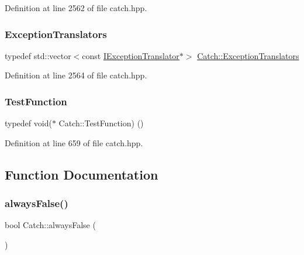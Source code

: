 Definition at line 2562 of file catch.\+hpp.

\hypertarget{namespace_catch_ae0442a3627f91437716106138b5f540b}{}\label{namespace_catch_ae0442a3627f91437716106138b5f540b} 
\subsubsection{\texorpdfstring{Exception\+Translators}{ExceptionTranslators}}
{\footnotesize\ttfamily typedef std\+::vector$<$const \hyperlink{struct_catch_1_1_i_exception_translator}{I\+Exception\+Translator}$\ast$$>$ \hyperlink{namespace_catch_ae0442a3627f91437716106138b5f540b}{Catch\+::\+Exception\+Translators}}



Definition at line 2564 of file catch.\+hpp.

\hypertarget{namespace_catch_a26414f52d0835939fae52aadd27e6257}{}\label{namespace_catch_a26414f52d0835939fae52aadd27e6257} 
\subsubsection{\texorpdfstring{Test\+Function}{TestFunction}}
{\footnotesize\ttfamily typedef void($\ast$ Catch\+::\+Test\+Function) ()}



Definition at line 659 of file catch.\+hpp.



\subsection{Function Documentation}
\hypertarget{namespace_catch_ad425271249dd02956a9709e78b8b2783}{}\label{namespace_catch_ad425271249dd02956a9709e78b8b2783} 
\subsubsection{\texorpdfstring{always\+False()}{alwaysFalse()}}
{\footnotesize\ttfamily bool Catch\+::always\+False (\begin{DoxyParamCaption}{ }\end{DoxyParamCaption})\hspace{0.3cm}{\ttfamily [inline]}}



